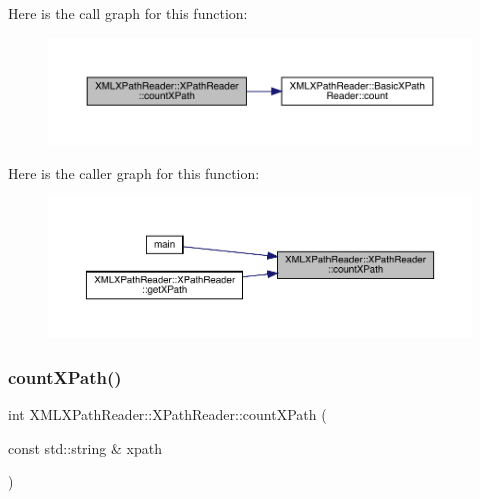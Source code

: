 Here is the call graph for this function\+:
\nopagebreak
\begin{figure}[H]
\begin{center}
\leavevmode
\includegraphics[width=350pt]{d3/d5a/classXMLXPathReader_1_1XPathReader_a9fd76703ea5321a4666ca9a0c07a222a_cgraph}
\end{center}
\end{figure}
Here is the caller graph for this function\+:\nopagebreak
\begin{figure}[H]
\begin{center}
\leavevmode
\includegraphics[width=350pt]{d3/d5a/classXMLXPathReader_1_1XPathReader_a9fd76703ea5321a4666ca9a0c07a222a_icgraph}
\end{center}
\end{figure}
\mbox{\label{classXMLXPathReader_1_1XPathReader_a9fd76703ea5321a4666ca9a0c07a222a}} 
\subsubsection{\texorpdfstring{countXPath()}{countXPath()}\hspace{0.1cm}{\footnotesize\ttfamily [2/2]}}
{\footnotesize\ttfamily int X\+M\+L\+X\+Path\+Reader\+::\+X\+Path\+Reader\+::count\+X\+Path (\begin{DoxyParamCaption}\item[{const std\+::string \&}]{xpath }\end{DoxyParamCaption})\hspace{0.3cm}{\ttfamily [inline]}}

